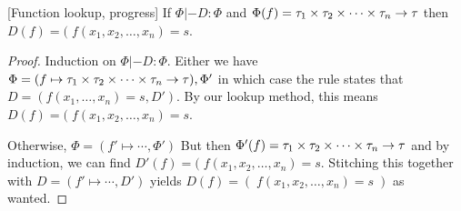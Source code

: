 \documentclass[a4paper, oneside, 10pt, draft]{memoir}
\begin{document}
\begin{lem}{[Function lookup, progress]}
  \label{lem:phi-lookup-good}
  If $\Phi |- D : \Phi$ and $\Phi(f) = \tau_1 \times \tau_2 \times \dotsb \times \tau_n -> \tau$ then $D(f) = (\; f(x_1,
  x_2, \dotsc, x_n) = s$.
\end{lem}
\begin{proof}
  Induction on $\Phi |- D : \Phi$. Either we have $\Phi = (f \mapsto
  \tau_1 \times \tau_2 \times \dotsb \times \tau_n -> \tau),\Phi'$ in which case the rule states that $D = (f(x_1,
  \dotsc, x_n) = s, D')$. By our lookup method, this means $D(f) = (\; f(x_1,
  x_2, \dotsc, x_n) = s$.

  Otherwise, $\Phi = (f' \mapsto \dotsb, \Phi')$ But then $\Phi'(f) =
  \tau_1 \times \tau_2 \times \dotsb \times \tau_n -> \tau$ and by induction, we can find $D'(f) = (\; f(x_1,
  x_2, \dotsc, x_n) = s$. Stitching this together with $D = (f'
  \mapsto \dotsb, D')$ yields $D(f) = (\; f(x_1,  x_2, \dotsc, x_n) =
  s \; )$ as wanted.
\end{proof}
\end{document}
